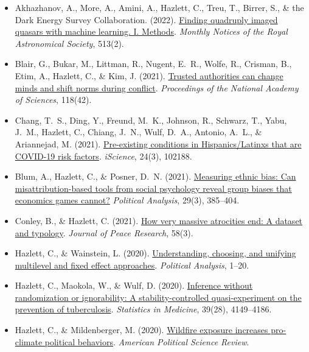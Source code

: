 \documentclass[11pt]{article}
\newcommand{\pubitem}[1]{\item #1}
\begin{document}
\begin{itemize}
\pubitem{Akhazhanov, A., More, A., Amini, A., Hazlett, C., Treu, T., Birrer, S., \& the Dark Energy Survey Collaboration. (2022). \href{https://chadhazlett.com/publications.html#akhazhanov_2022_quasars_ml}{Finding quadruply imaged quasars with machine learning. I. Methods}. \textit{Monthly Notices of the Royal Astronomical Society}, 513(2).}

\pubitem{Blair, G., Bukar, M., Littman, R., Nugent, E.~R., Wolfe, R., Crisman, B., Etim, A., Hazlett, C., \& Kim, J. (2021). \href{https://chadhazlett.com/publications.html#blair_2021_trusted_authorities}{Trusted authorities can change minds and shift norms during conflict}. \textit{Proceedings of the National Academy of Sciences}, 118(42).}

\pubitem{Chang, T.~S., Ding, Y., Freund, M.~K., Johnson, R., Schwarz, T., Yabu, J.~M., Hazlett, C., Chiang, J.~N., Wulf, D.~A., Antonio, A.~L., \& Ariannejad, M. (2021). \href{https://chadhazlett.com/publications.html#chang_2021_covid_hispanics}{Pre-existing conditions in Hispanics/Latinxs that are COVID-19 risk factors}. \textit{iScience}, 24(3), 102188.}

\pubitem{Blum, A., Hazlett, C., \& Posner, D.~N. (2021). \href{https://chadhazlett.com/publications.html#blum_hazlett_posner_2021_ethnic_bias}{Measuring ethnic bias: Can misattribution-based tools from social psychology reveal group biases that economics games cannot?} \textit{Political Analysis}, 29(3), 385--404.}

\pubitem{Conley, B., \& Hazlett, C. (2021). \href{https://chadhazlett.com/publications.html#conley_hazlett_2021_atrocities}{How very massive atrocities end: A dataset and typology}. \textit{Journal of Peace Research}, 58(3).}

\pubitem{Hazlett, C., \& Wainstein, L. (2020). \href{https://chadhazlett.com/publications.html#hazlett_wainstein_2020_multilevel}{Understanding, choosing, and unifying multilevel and fixed effect approaches}. \textit{Political Analysis}, 1--20.}

\pubitem{Hazlett, C., Maokola, W., \& Wulf, D. (2020). \href{https://chadhazlett.com/publications.html#hazlett_maokola_wulf_2020_tuberculosis}{Inference without randomization or ignorability: A stability-controlled quasi-experiment on the prevention of tuberculosis}. \textit{Statistics in Medicine}, 39(28), 4149--4186.}

\pubitem{Hazlett, C., \& Mildenberger, M. (2020). \href{https://chadhazlett.com/publications.html#hazlett_mildenberger_2020_wildfire}{Wildfire exposure increases pro-climate political behaviors}. \textit{American Political Science Review}.}


\end{itemize}
\end{document}
